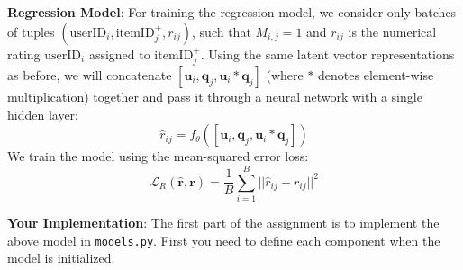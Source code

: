 \documentclass[12pt]{article}
\begin{document}
\noindent\textbf{Regression Model}: For training the regression model, we consider only batches of tuples $(\text{userID}_i, \text{itemID}_j^+, r_{ij})$, such that $M_{i, j} = 1$ and $r_{ij}$ is the numerical rating $\text{userID}_i$ assigned to $\text{itemID}_j^+$. Using the same latent vector representations as before, we will concatenate $[\mathbf{u}_i, \mathbf{q}_j, \mathbf{u}_i * \mathbf{q}_j]$ (where $*$ denotes element-wise multiplication) together and pass it through a neural network with a single hidden layer:
\begin{equation}
    \hat{r}_{ij}=f_{\theta}([\mathbf{u}_i, \mathbf{q}_j, \mathbf{u}_i * \mathbf{q}_j])
    \label{eq:reg}
\end{equation}
We train the model using the mean-squared error loss:
    \begin{equation}
       \mathcal{L}_R(\mathbf{\hat{r}}, \mathbf{r})= \frac{1}{B}\sum_{i=1}^B ||\hat{r}_{ij}-r_{ij}||^2
     \label{eq:r}
    \end{equation}

\vspace{0.2cm}

\noindent \noindent\textbf{Your Implementation}: The first part of the assignment is to implement the above model in \texttt{models.py}. First you need to define each component when the model is initialized. 
\end{document}
